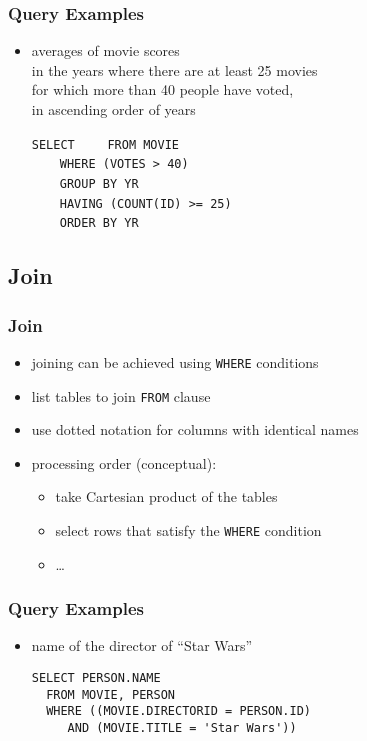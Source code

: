 \documentclass[dvipsnames]{beamer}
\theoremstyle{plain}
\begin{document}
\begin{frame}[fragile]
  \frametitle{Query Examples}

  \begin{itemize}
    \item averages of movie scores\\
      in the years where there are at least 25 movies\\
      for which more than 40 people have voted,\\
      in ascending order of years

\medskip
\lstinline!SELECT! 
~~~~\lstinline!FROM MOVIE!\\
\pause
~~~~\lstinline!WHERE (VOTES > 40)!\\
\pause
~~~~\lstinline!GROUP BY YR!\\
\pause
~~~~\lstinline!HAVING (COUNT(ID) >= 25)!\\
\pause\pause
~~~~\lstinline!ORDER BY YR!
  \end{itemize}
\end{frame}

\subsection{Join}

\begin{frame}
  \frametitle{Join}

  \begin{itemize}
    \item joining can be achieved using \lstinline!WHERE! conditions
    \item list tables to join \lstinline!FROM! clause
    \item use dotted notation for columns with identical names

    \pause
    \medskip
    \item processing order (conceptual):
    \begin{itemize}
      \item take Cartesian product of the tables
      \item select rows that satisfy the \lstinline!WHERE! condition
      \item \ldots
    \end{itemize}
  \end{itemize}
\end{frame}

\begin{frame}[fragile]
  \frametitle{Query Examples}

  \begin{itemize}
    \item name of the director of ``Star Wars''
    \begin{lstlisting}
SELECT PERSON.NAME
  FROM MOVIE, PERSON
  WHERE ((MOVIE.DIRECTORID = PERSON.ID)
     AND (MOVIE.TITLE = 'Star Wars'))
    \end{lstlisting}
  \end{itemize}
\end{frame}
\end{document}
